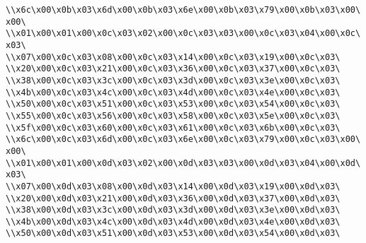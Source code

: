 \verb|\\x6c\x00\x0b\x03\x6d\x00\x0b\x03\x6e\x00\x0b\x03\x79\x00\x0b\x03\x00\x00\|\newline
\verb|\\x01\x00\x01\x00\x0c\x03\x02\x00\x0c\x03\x03\x00\x0c\x03\x04\x00\x0c\x03\|\newline
\verb|\\x07\x00\x0c\x03\x08\x00\x0c\x03\x14\x00\x0c\x03\x19\x00\x0c\x03\|\newline
\verb|\\x20\x00\x0c\x03\x21\x00\x0c\x03\x36\x00\x0c\x03\x37\x00\x0c\x03\|\newline
\verb|\\x38\x00\x0c\x03\x3c\x00\x0c\x03\x3d\x00\x0c\x03\x3e\x00\x0c\x03\|\newline
\verb|\\x4b\x00\x0c\x03\x4c\x00\x0c\x03\x4d\x00\x0c\x03\x4e\x00\x0c\x03\|\newline
\verb|\\x50\x00\x0c\x03\x51\x00\x0c\x03\x53\x00\x0c\x03\x54\x00\x0c\x03\|\newline
\verb|\\x55\x00\x0c\x03\x56\x00\x0c\x03\x58\x00\x0c\x03\x5e\x00\x0c\x03\|\newline
\verb|\\x5f\x00\x0c\x03\x60\x00\x0c\x03\x61\x00\x0c\x03\x6b\x00\x0c\x03\|\newline
\verb|\\x6c\x00\x0c\x03\x6d\x00\x0c\x03\x6e\x00\x0c\x03\x79\x00\x0c\x03\x00\x00\|\newline
\verb|\\x01\x00\x01\x00\x0d\x03\x02\x00\x0d\x03\x03\x00\x0d\x03\x04\x00\x0d\x03\|\newline
\verb|\\x07\x00\x0d\x03\x08\x00\x0d\x03\x14\x00\x0d\x03\x19\x00\x0d\x03\|\newline
\verb|\\x20\x00\x0d\x03\x21\x00\x0d\x03\x36\x00\x0d\x03\x37\x00\x0d\x03\|\newline
\verb|\\x38\x00\x0d\x03\x3c\x00\x0d\x03\x3d\x00\x0d\x03\x3e\x00\x0d\x03\|\newline
\verb|\\x4b\x00\x0d\x03\x4c\x00\x0d\x03\x4d\x00\x0d\x03\x4e\x00\x0d\x03\|\newline
\verb|\\x50\x00\x0d\x03\x51\x00\x0d\x03\x53\x00\x0d\x03\x54\x00\x0d\x03\|\newline
